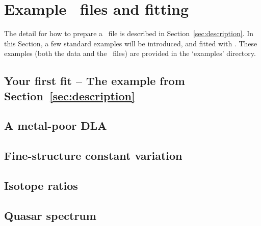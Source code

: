 \section{Example \dmod\ files and fitting}

The detail for how to prepare a \dmod\ file
is described in Section~\ref{sec:description}.
In this Section, a few standard examples will
be introduced, and fitted with \alis. These
examples (both the data and the \dmod\ files)
are provided in the `examples' directory.

\subsection{Your first fit -- The example from Section~\ref{sec:description}}



\subsection{A metal-poor DLA}


\subsection{Fine-structure constant variation}


\subsection{Isotope ratios}


\subsection{Quasar spectrum}
